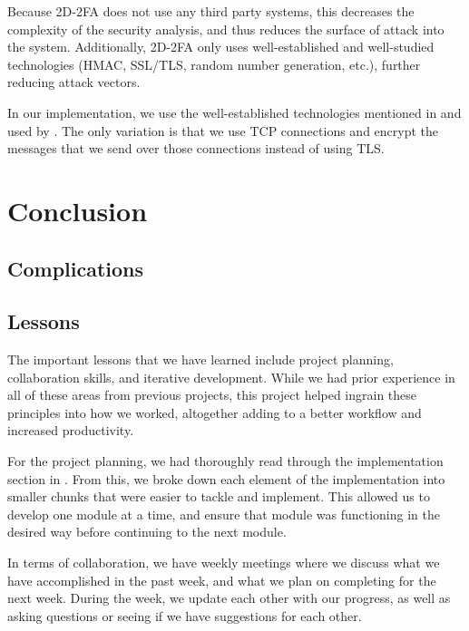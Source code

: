 \documentclass[11pt]{article} %
\begin{document}
Because 2D-2FA does not use any third party systems, this decreases the
complexity of the security analysis, and thus reduces the surface of
attack into the system. Additionally, 2D-2FA only uses well-established
and well-studied technologies (HMAC, SSL/TLS, random number generation,
etc.), further reducing attack vectors.

In our implementation, we use the well-established technologies
mentioned in and used by \cite{shirvanian2d2fa}. The only variation is
that we use TCP connections and encrypt the messages
that we send over those connections instead of using TLS.

\section{Conclusion}



\subsection{Complications}



\subsection{Lessons}

The important lessons that we have learned include project planning,
collaboration skills, and iterative development. While we had prior
experience in all of these areas from previous projects, this project
helped ingrain these principles into how we worked, altogether adding to
a better workflow and increased productivity. 

For the project planning, we had thoroughly read through the
implementation section in \cite{shirvanian2d2fa}. From this, we 
broke down each element of the implementation into smaller chunks that
were easier to tackle and implement. This allowed us to develop one
module at a time, and ensure that module was functioning in the desired
way before continuing to the next module. 

In terms of collaboration, we have weekly meetings where we discuss what
we have accomplished in the past week, and what we plan on completing
for the next week. During the week, we update each other with our
progress, as well as asking questions or seeing if we have suggestions
for each other. 
\end{document}
